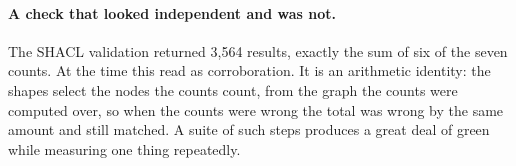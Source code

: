 \paragraph{A check that looked independent and was not.}
The SHACL validation returned 3{,}564 results, exactly the sum of six of the
seven counts. At the time this read as corroboration. It is an arithmetic
identity: the shapes select the nodes the counts count, from the graph the counts
were computed over, so when the counts were wrong the total was wrong by the same
amount and still matched. A suite of such steps produces a great deal of green
while measuring one thing repeatedly.
